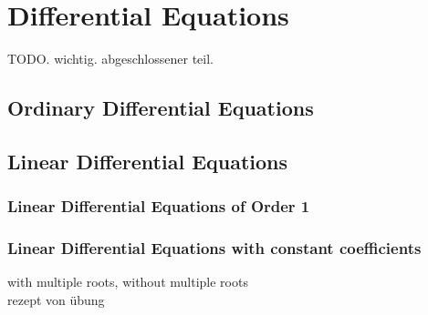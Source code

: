 \section{Differential Equations}

TODO. wichtig. abgeschlossener teil.

\subsection{Ordinary Differential Equations}

\subsection{Linear Differential Equations}

\subsubsection{Linear Differential Equations of Order 1}

\subsubsection{Linear Differential Equations with constant coefficients}

with multiple roots, without multiple roots\\

rezept von übung